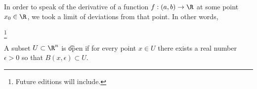 

In order to speak of the derivative of a function $f: (a, b) \to \R$ at some point $x_0 \in \R$, we took a limit of deviations from that point.
In other words,

\footnote{Future editions will include.}



A subset $U \subset \R^n$ is \t{open} if for every point $x \in U$ there exists a real number $\epsilon > 0$ so that $B(x, \epsilon) \subset U$.

\blankpage
